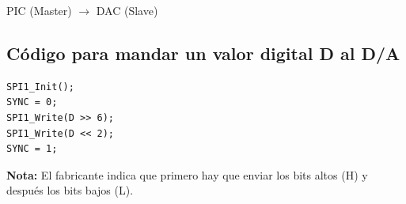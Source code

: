 \documentclass{article}
\theoremstyle{definition} %
\begin{document}
\begin{center}
\Large PIC (Master) $\longrightarrow$ DAC (Slave)
\end{center}

\subsection{Código para mandar un valor digital D al D/A}
\begin{verbatim}
SPI1_Init();
SYNC = 0;
SPI1_Write(D >> 6);
SPI1_Write(D << 2);
SYNC = 1;
\end{verbatim}
\noindent\textbf{Nota:} El fabricante indica que primero hay que enviar los bits altos (H) y después los bits bajos (L).
\end{document}
